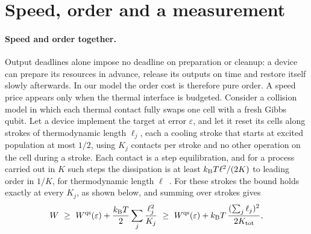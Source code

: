 \section{Speed, order and a measurement}\label{to:sec:measure}

\paragraph{Speed and order together.} Output deadlines alone impose no deadline on preparation or cleanup: a device can prepare its resources in advance, release its outputs on time and restore itself slowly afterwards. In our model the order cost is therefore pure order. A speed price appears only when the thermal interface is budgeted. Consider a collision model in which each thermal contact fully swaps one cell with a fresh Gibbs qubit. Let a device implement the target at error $\varepsilon$, and let it reset its cells along strokes of thermodynamic length $\ell_j$, each a cooling stroke that starts at excited population at most $1/2$, using $K_j$ contacts per stroke and no other operation on the cell during a stroke. Each contact is a step equilibration, and for a process carried out in $K$ such steps the dissipation is at least $k_{\mathrm B} T\ell^2/(2K)$ to leading order in $1/K$, for thermodynamic length $\ell$~\cite{SalamonBerry83,Nulton85,Crooks07,ScandiPerarnauLlobet19,Abiuso20}. For these strokes the bound holds exactly at every $K_j$, as shown below, and summing over strokes gives
\[
W\ \ge\ W^{\mathrm{qs}}(\varepsilon)+\frac{k_{\mathrm B} T}{2}\sum_j\frac{\ell_j^2}{K_j}\ \ge\ W^{\mathrm{qs}}(\varepsilon)+k_{\mathrm B} T\,\frac{(\sum_j\ell_j)^2}{2K_{\mathrm{tot}}},
\]
